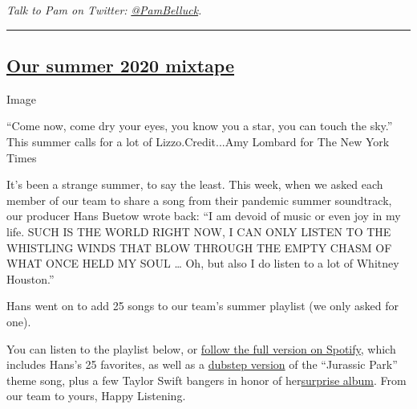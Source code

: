 \emph{Talk to Pam on Twitter:}
\href{https://twitter.com/pambelluck?lang=en}{\emph{@PamBelluck}}\emph{.}

\begin{center}\rule{0.5\linewidth}{\linethickness}\end{center}

\hypertarget{our-summer-2020-mixtape}{%
\subsection{\texorpdfstring{\href{https://open.spotify.com/playlist/0GvVwghTzyY4lR722dCeM0?si=xQezj1zNTeK1bSZriRY3zg}{Our
summer 2020
mixtape}}{Our summer 2020 mixtape}}\label{our-summer-2020-mixtape}}

Image

``Come now, come dry your eyes, you know you a star, you can touch the
sky.'' This summer calls for a lot of Lizzo.Credit...Amy Lombard for The
New York Times

It's been a strange summer, to say the least. This week, when we asked
each member of our team to share a song from their pandemic summer
soundtrack, our producer Hans Buetow wrote back: ``I am devoid of music
or even joy in my life. SUCH IS THE WORLD RIGHT NOW, I CAN ONLY LISTEN
TO THE WHISTLING WINDS THAT BLOW THROUGH THE EMPTY CHASM OF WHAT ONCE
HELD MY SOUL \ldots{} Oh, but also I do listen to a lot of Whitney
Houston.''

Hans went on to add 25 songs to our team's summer playlist (we only
asked for one).

You can listen to the playlist below, or
\href{https://open.spotify.com/playlist/0GvVwghTzyY4lR722dCeM0?si=SLnkYCqgRLaF-nUDcTHCFA}{follow
the full version on Spotify}, which includes Hans's 25 favorites, as
well as a \href{https://www.youtube.com/watch?v=fE0uc92JlCc}{dubstep
version} of the ``Jurassic Park'' theme song, plus a few Taylor Swift
bangers in honor of
her\href{https://www.nytimes.com/aponline/2020/07/23/us/ap-us-music-taylor-swift.html}{surprise
album}. From our team to yours, Happy Listening.

